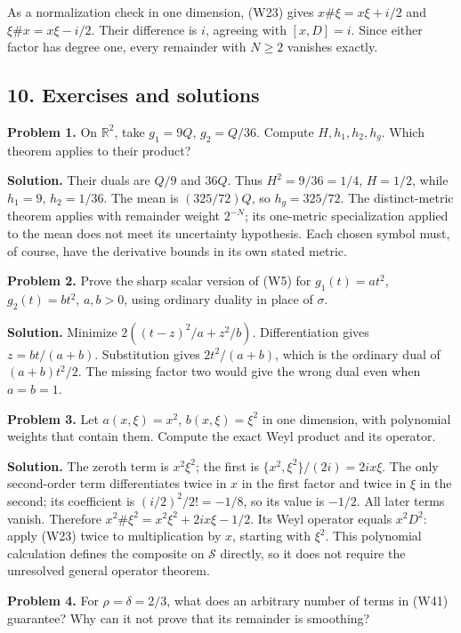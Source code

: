 \documentclass[
  11pt,
]{article}
\begin{document}
As a normalization check in one dimension, (W23) gives
\(x\#\xi=x\xi+i/2\) and \(\xi\#x=x\xi-i/2\). Their difference is \(i\),
agreeing with \([x,D]=i\). Since either factor has degree one, every
remainder with \(N\geq2\) vanishes exactly.

\subsection{10. Exercises and solutions}\label{exercises-and-solutions}

\textbf{Problem 1.} On \(\mathbb R^2\), take \(g_1=9Q\), \(g_2=Q/36\).
Compute \(H,h_1,h_2,h_g\). Which theorem applies to their product?

\textbf{Solution.} Their duals are \(Q/9\) and \(36Q\). Thus
\(H^2=9/36=1/4\), \(H=1/2\), while \(h_1=9\), \(h_2=1/36\). The mean is
\((325/72)Q\), so \(h_g=325/72\). The distinct-metric theorem applies
with remainder weight \(2^{-N}\); its one-metric specialization applied
to the mean does not meet its uncertainty hypothesis. Each chosen symbol
must, of course, have the derivative bounds in its own stated metric.

\textbf{Problem 2.} Prove the sharp scalar version of (W5) for
\(g_1(t)=a t^2\), \(g_2(t)=b t^2\), \(a,b>0\), using ordinary duality in
place of \(\sigma\).

\textbf{Solution.} Minimize \(2((t-z)^2/a+z^2/b)\). Differentiation
gives \(z=bt/(a+b)\). Substitution gives \(2t^2/(a+b)\), which is the
ordinary dual of \((a+b)t^2/2\). The missing factor two would give the
wrong dual even when \(a=b=1\).

\textbf{Problem 3.} Let \(a(x,\xi)=x^2\), \(b(x,\xi)=\xi^2\) in one
dimension, with polynomial weights that contain them. Compute the exact
Weyl product and its operator.

\textbf{Solution.} The zeroth term is \(x^2\xi^2\); the first is
\(\{x^2,\xi^2\}/(2i)=2ix\xi\). The only second-order term differentiates
twice in \(x\) in the first factor and twice in \(\xi\) in the second;
its coefficient is \((i/2)^2/2!=-1/8\), so its value is \(-1/2\). All
later terms vanish. Therefore \(x^2\#\xi^2=x^2\xi^2+2ix\xi-1/2\). Its
Weyl operator equals \(x^2D^2\): apply (W23) twice to multiplication by
\(x\), starting with \(\xi^2\). This polynomial calculation defines the
composite on \(\mathcal S\) directly, so it does not require the
unresolved general operator theorem.

\textbf{Problem 4.} For \(\rho=\delta=2/3\), what does an arbitrary
number of terms in (W41) guarantee? Why can it not prove that its
remainder is smoothing?
\end{document}
